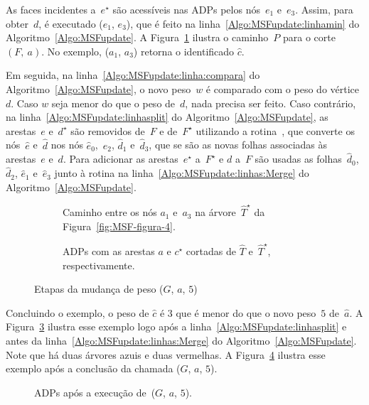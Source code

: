 As faces incidentes a~$e^\star$ são acessíveis nas ADPs pelos nós~$e_1$ e~$e_3$.
Assim, para obter~$d$, é executado \LCOMin($e_1$, $e_3$), que é feito na linha~\ref{Algo:MSFupdate:linhamin} do Algoritmo~\ref{Algo:MSFupdate}.
A Figura~\ref{fig:MSF-figura-5} ilustra o caminho~$P$ para o corte $(F,~a)$.
No exemplo, \LCOMin($a_1$, $a_3$) retorna o identificado $\hat c$.


Em seguida, na linha~\ref{Algo:MSFupdate:linha:compara} do Algoritmo~\ref{Algo:MSFupdate}, o novo peso~$w$ é comparado com o peso do vértice~$d$.
Caso $w$ seja menor do que o peso de~$d$, nada precisa ser feito.
Caso contrário, na linha~\ref{Algo:MSFupdate:linhasplit} do Algoritmo~\ref{Algo:MSFupdate}, as arestas~$e$ e~$d^\star$ são removidos de~$F$ e de~$F^\star$ utilizando a rotina~\LCOSplit{}, que converte os nós~$\hat e$ e~$\hat d$ nos nós $\hat e_0$,~$\hat e_2$, $\hat d_1$ e~$\hat d_3$, que se são as novas folhas associadas às arestas~$e$ e~$d$.
Para adicionar as arestas~$e^\star$ a~$F^\star$ e $d$ a~$F$ são usadas as folhas~$\hat d_0$, $\hat d_2$, $\hat e_1$ e~$\hat e_3$ junto à rotina \LCOMerge{} na linha~\ref{Algo:MSFupdate:linhas:Merge} do Algoritmo~\ref{Algo:MSFupdate}.

\begin{figure}[htb]
\begin{subfigure}{.3\textwidth}
\scalebox{.8}{

}
\caption{Caminho entre os nós $a_1$ e~$a_3$ na árvore~$\hat T^\star$ da Figura~\ref{fig:MSF-figura-4}.}
\label{fig:MSF-figura-5}
\end{subfigure}
\hspace{1cm}
\begin{subfigure}{.6\textwidth}
\scalebox{.8}{

}
\caption{ADPs com as arestas $a$ e $c^\star$ cortadas de $\hat T$ e~$\hat T^\star$, respectivamente.}
\label{fig:MSF-figura-6}
\end{subfigure}
\caption{Etapas da mudança de peso \MSFupdate($G$, $a$, $5$)}
\end{figure}

Concluindo o exemplo, o peso de $\hat c$ é $3$ que é menor do que o novo peso~$5$ de~$\hat a$.
A Figura~\ref{fig:MSF-figura-6} ilustra esse exemplo logo após a linha~\ref{Algo:MSFupdate:linhasplit} e antes da linha~\ref{Algo:MSFupdate:linhas:Merge} do Algoritmo~\ref{Algo:MSFupdate}.
Note que há duas árvores azuis e duas vermelhas.
A Figura~\ref{fig:MSF-figura-7} ilustra esse exemplo após a conclusão da chamada \MSFupdate($G$, $a$, $5$).

\begin{figure}[htb]
\scalebox{1}{
\centering

}
\caption{ADPs após a execução de~\MSFupdate($G$, $a$, $5$).}
\label{fig:MSF-figura-7}
\end{figure}

